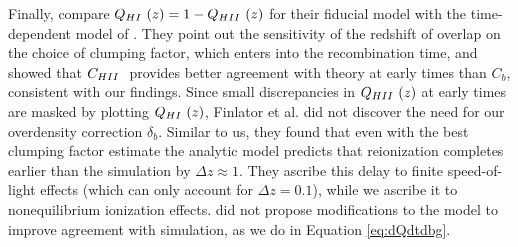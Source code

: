 Finally, \cite{FinlatorEtAl2012} compare $Q_{\hi}(z)=1-Q_{\hii}(z)$ for their fiducial model with the time-dependent model of \cite{MadauEtAl1999}. They point out the sensitivity of the redshift of overlap on the choice of clumping factor, which enters into the recombination time, and showed that $C_{\hii}$ provides better agreement with theory at early times than $C_b$, consistent with our findings. Since small discrepancies in $Q_{\hii}(z)$ at early times are masked by plotting $Q_{\hi}(z)$, Finlator et al. did not discover the need for our overdensity correction $\delta_b$. Similar to us, they found that even with the best clumping factor estimate the analytic model predicts that reionization completes earlier than the simulation by $\Delta z \approx 1$. They ascribe this delay to finite speed-of-light effects (which can only account for $\Delta z =0.1$), while we ascribe it to nonequilibrium ionization effects. \cite{FinlatorEtAl2012} did not propose modifications to the \cite{MadauEtAl1999} model to improve agreement with simulation, as we do in Equation \eqref{eq:dQdtdbg}.


